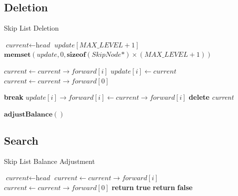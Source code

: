 \documentclass[12pt]{article}
\begin{document}
  \subsection{Deletion}
  \begin{algorithm}[H]
  \caption{Skip List Deletion}
  \begin{algorithmic}[1]
      \State $\textit{current} \gets \textit{head}$
      \State $\textit{update}[MAX\_LEVEL + 1]$
      \State $\textbf{memset}(\textit{update}, 0, \textbf{sizeof}(\textit{SkipNode*}) \times (MAX\_LEVEL + 1))$
      
              \State $\textit{current} \gets \textit{current}\rightarrow\textit{forward}[i]$
          \EndWhile
          \State $\textit{update}[i] \gets \textit{current}$
      \EndFor
      \State $\textit{current} \gets \textit{current}\rightarrow\textit{forward}[0]$
      
                  \State \textbf{break}
              \EndIf
              \State $\textit{update}[i]\rightarrow\textit{forward}[i] \gets \textit{current}\rightarrow\textit{forward}[i]$
          \EndFor
          \State \textbf{delete} \textit{current}
          
          \State $\textbf{adjustBalance}()$
      \EndIf
  \EndProcedure
  \end{algorithmic}
  \end{algorithm}
  \subsection{Search}
  \begin{algorithm}[H]
  \caption{Skip List Balance Adjustment}
  \begin{algorithmic}[1]
        \State $\textit{current} \gets \textit{head}$
                \State $\textit{current} \gets \textit{current}\rightarrow\textit{forward}[i]$
            \EndWhile
        \EndFor
        \State $\textit{current} \gets \textit{current}\rightarrow\textit{forward}[0]$
            \State \textbf{return} \textbf{true}
        \Else
            \State \textbf{return} \textbf{false}
        \EndIf
    \EndFunction
    \end{algorithmic}
    \end{algorithm}
\end{document}

